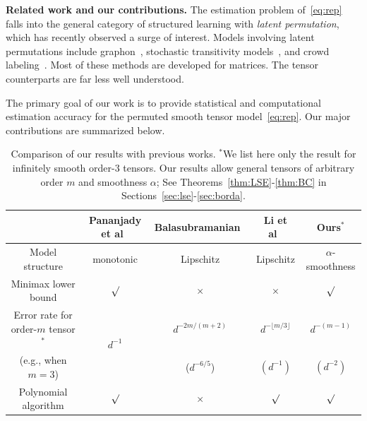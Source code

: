 \documentclass{article}
\theoremstyle{definition}
\begin{document}
{\bf Related work and our contributions.} The estimation problem of~\eqref{eq:rep} falls into the general category of structured learning with \emph{latent permutation}, which has recently observed a surge of interest. Models involving latent permutations include graphon~\cite{gao2021minimax,klopp2017oracle}, stochastic transitivity models~\cite{shah2019low}, and crowd labeling~\cite{li2019nearest}. Most of these methods are developed for matrices. The tensor counterparts are far less well understood. 


The primary goal of our work is to provide statistical and computational estimation accuracy for the permuted smooth tensor model~\eqref{eq:rep}. Our major contributions are summarized below.
\vspace{-.2cm}
\begin{table}[http]
    \centering
    \begin{tabular}{c|cccc}
    & Pananjady et al~\cite{pananjady2020isotonic}&  Balasubramanian~\cite{balasubramanian2021nonparametric}&  Li et al~\cite{li2019nearest}&\textbf{Ours$^*$}\\
    \hline
       Model structure& monotonic & Lipschitz & Lipschitz &  $\alpha$-smoothness  \\
     Minimax lower bound& $\surd$  & $\times$ & $\times$ & $\surd$ \\
 Error rate for order-$m$ tensor$^*$ & \multirow{2}{*}{$d^{-1}$} & $d^{-{2m/(m+2)}}$ & $d^{-\lfloor m/3\rfloor }$ & $d^{-(m-1)}$ \\
       (e.g., when $m=3$) & & ($d^{-6/5}$) & $(d^{-1})$ & $(d^{-2})$ \\

     Polynomial algorithm& $\surd$ &$\times$ & $\surd$ & $\surd$\\
        \hline
    \end{tabular}
    \caption{\small Comparison of our results with previous works. $^*$We  list here only the result for infinitely smooth order-3 tensors. Our results allow general tensors of arbitrary order $m$ and smoothness $\alpha$; See Theorems~\ref{thm:LSE}-\ref{thm:BC} in Sections~\ref{sec:lse}-\ref{sec:borda}.}\label{tab:comp}
\end{table}
\vspace{-.3cm}
\end{document}
